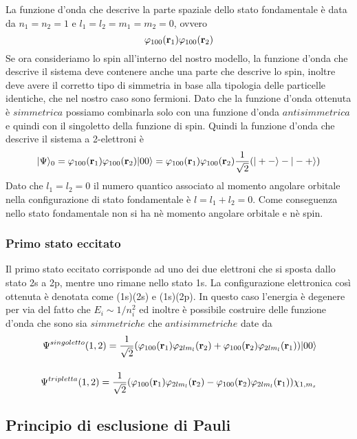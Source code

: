La funzione d'onda che descrive la parte spaziale dello stato fondamentale \`e data da $n_1 =n_2 =1$ e $l_1 =l_2 = m_1 = m_2 =0$, ovvero
\begin{equation*}
	\varphi_{100}(\bold{r}_1)\varphi_{100}(\bold{r}_2)
\end{equation*}
Se ora consideriamo lo spin all'interno del nostro modello, la funzione d'onda che descrive il sistema deve contenere anche una parte che descrive lo spin, inoltre deve avere il corretto tipo di simmetria in base alla tipologia delle particelle identiche, che nel nostro caso sono fermioni. Dato che la funzione d'onda ottenuta \`e $simmetrica$ possiamo combinarla solo con una funzione d'onda $antisimmetrica$ e quindi con il singoletto della funzione di spin.  Quindi la funzione d'onda che descrive il sistema a 2-elettroni \`e
\begin{equation*}
	|\Psi \rangle_{0} = \varphi_{100}(\bold{r}_1)\varphi_{100}(\bold{r}_2)|00\rangle = \varphi_{100}(\bold{r}_1)\varphi_{100}(\bold{r}_2) \frac{1}{\sqrt{2}}(|+- \rangle - |-+ \rangle)
\end{equation*}
Dato che $l_1 = l_2 = 0$ il numero quantico associato al momento angolare orbitale nella configurazione di stato fondamentale \`e  $l = l_1 + l_2 = 0$. Come conseguenza nello stato fondamentale non si ha n\`e momento angolare orbitale e n\`e spin.

\subsubsection{Primo stato eccitato}

Il primo stato eccitato corrisponde  ad uno dei due elettroni che si sposta dallo stato 2s a 2p, mentre uno rimane nello stato 1s. La configurazione elettronica cos\`i ottenuta \`e denotata come (1s)(2s) e (1s)(2p). In questo caso l'energia \`e degenere per via del fatto che $E_i \sim 1/n_i^2$ ed inoltre \`e possibile costruire delle funzione d'onda che sono sia $simmetriche$ che $antisimmetriche $ date da 
\begin{align*}
\Psi^{singoletto}(1,2) = \frac{1}{\sqrt{2}}(\varphi_{100}(\bold{r}_1)\varphi_{2lm_l}(\bold{r}_2)	 + \varphi_{100}(\bold{r}_2)\varphi_{2lm_l}(\bold{r}_1))|00\rangle	\\[0.4cm]
\Psi^{tripletta}(1,2) = \frac{1}{\sqrt{2}}(\varphi_{100}(\bold{r}_1)\varphi_{2lm_l}(\bold{r}_2)	 - \varphi_{100}(\bold{r}_2)\varphi_{2lm_l}(\bold{r}_1))\chi_{1,m_s}
\end{align*}

\subsection{Principio di esclusione di Pauli}

